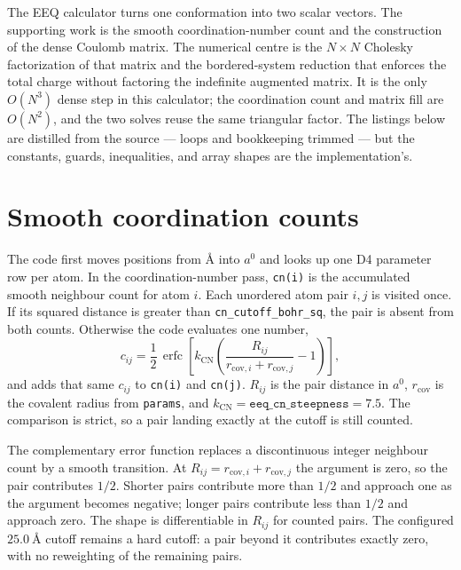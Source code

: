 \documentclass[11pt]{article}
\newcommand{\code}[1]{\texttt{#1}}
\begin{document}

The EEQ calculator turns one conformation into two scalar vectors. The
supporting work is the smooth coordination-number count and the construction of
the dense Coulomb matrix. The numerical centre is the \(N\times N\) Cholesky
factorization of that matrix and the bordered-system reduction that enforces
the total charge without factoring the indefinite augmented matrix. It is the
only \(O(N^3)\) dense step in this calculator; the coordination count and
matrix fill are \(O(N^2)\), and the two solves reuse the same triangular
factor. The listings below are distilled from the source --- loops and
bookkeeping trimmed --- but the constants, guards, inequalities, and array
shapes are the implementation's.

\section{Smooth coordination counts}

The code first moves positions from \(\si{\angstrom}\) into \(\si{\bohr}\) and
looks up one D4 parameter row per atom. In the coordination-number pass,
\code{cn(i)} is the accumulated smooth neighbour count for atom \(i\). Each
unordered atom pair \(i,j\) is visited once. If its squared distance is greater
than \code{cn\_cutoff\_bohr\_sq}, the pair is absent from both counts. Otherwise
the code evaluates one number,
\[
  c_{ij}=
  \frac12\,\operatorname{erfc}
  \left[
    k_{\mathrm{CN}}
    \left(
      \frac{R_{ij}}{r_{\mathrm{cov},i}+r_{\mathrm{cov},j}}-1
    \right)
  \right],
\]
and adds that same \(c_{ij}\) to \code{cn(i)} and \code{cn(j)}.
\(R_{ij}\) is the pair distance in \(\si{\bohr}\),
\(r_{\mathrm{cov}}\) is the covalent radius from \code{params}, and
\(k_{\mathrm{CN}}=\code{eeq\_cn\_steepness}=7.5\). The comparison is strict, so
a pair landing exactly at the cutoff is still counted.

The complementary error function replaces a discontinuous integer neighbour
count by a smooth transition. At
\(R_{ij}=r_{\mathrm{cov},i}+r_{\mathrm{cov},j}\) the argument is zero, so the
pair contributes \(1/2\). Shorter pairs contribute more than \(1/2\) and
approach one as the argument becomes negative; longer pairs contribute less
than \(1/2\) and approach zero. The shape is differentiable in \(R_{ij}\) for
counted pairs. The configured \(\SI{25.0}{\angstrom}\) cutoff remains a hard
cutoff: a pair beyond it contributes exactly zero, with no reweighting of the
remaining pairs.
\end{document}

